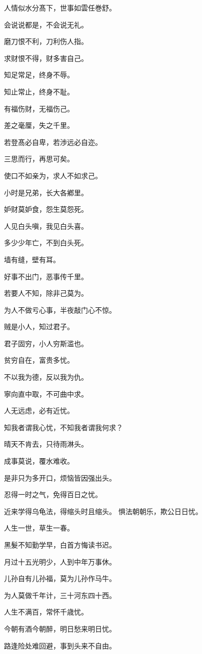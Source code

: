 \documentclass[12pt,oneside]{book}
\begin{document}
人情似水分髙下，世事如雲任巻舒。

会说说都是，不会说无礼。

磨刀恨不利，刀利伤人指。

求财恨不得，财多害自己。

知足常足，终身不辱。

知止常止，终身不耻。

有福伤财，无福伤己。

差之毫厘，失之千里。

若登髙必自卑，若渉远必自迩。

三思而行，再思可矣。

使口不如亲为，求人不如求己。

小时是兄弟，长大各鄕里。

妒财莫妒食，怨生莫怨死。

人见白头嗔，我见白头喜。

多少少年亡，不到白头死。

墙有缝，壁有耳。

好事不出门，恶事传千里。

若要人不知，除非己莫为。

为人不做亏心事，半夜敲门心不惊。

贼是小人，知过君子。

君子固穷，小人穷斯滥也。

贫穷自在，富贵多忧。

不以我为德，反以我为仇。

寧向直中取，不可曲中求。

人无远虑，必有近忧。

知我者谓我心忧，不知我者谓我何求？

晴天不肯去，只待雨淋头。

成事莫说，覆水难收。

是非只为多开口，烦恼皆因强出头。

忍得一时之气，免得百日之忧。

近来学得乌龟法，得缩头时且缩头。
惧法朝朝乐，欺公日日忧。


人生一世，草生一春。

黑髮不知勤学早，白首方悔读书迟。

月过十五光明少，人到中年万事休。

儿孙自有儿孙福，莫为儿孙作马牛。

为人莫做千年计，三十河东四十西。

人生不满百，常怀千歳忧。

今朝有酒今朝醉，明日愁来明日忧。

路逢险处难回避，事到头来不自由。
\end{document}
